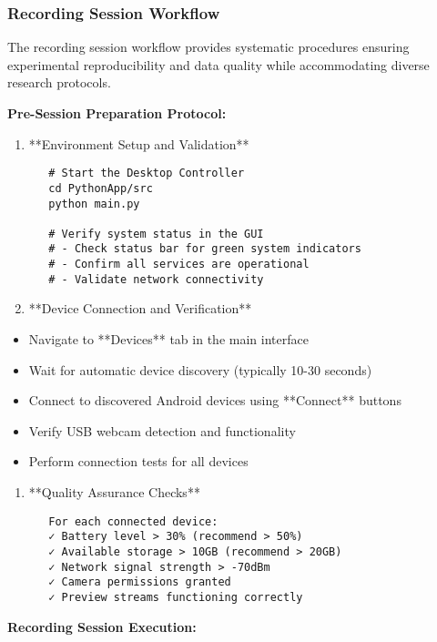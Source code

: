 \documentclass[12pt,a4paper]{article}
\begin{document}
\subsubsection{Recording Session Workflow}

The recording session workflow provides systematic procedures ensuring experimental reproducibility and data quality
while accommodating diverse research protocols.

\textbf{Pre-Session Preparation Protocol:}

\begin{enumerate}
\item **Environment Setup and Validation**
\begin{verbatim}
   # Start the Desktop Controller
   cd PythonApp/src
   python main.py
   
   # Verify system status in the GUI
   # - Check status bar for green system indicators
   # - Confirm all services are operational
   # - Validate network connectivity
\end{verbatim}

\item **Device Connection and Verification**
\end{enumerate}
\begin{itemize}
\item Navigate to **Devices** tab in the main interface
\item Wait for automatic device discovery (typically 10-30 seconds)
\item Connect to discovered Android devices using **Connect** buttons
\item Verify USB webcam detection and functionality
\item Perform connection tests for all devices

\end{itemize}
\begin{enumerate}
\item **Quality Assurance Checks**
\begin{verbatim}
   For each connected device:
   ✓ Battery level > 30% (recommend > 50%)
   ✓ Available storage > 10GB (recommend > 20GB)
   ✓ Network signal strength > -70dBm
   ✓ Camera permissions granted
   ✓ Preview streams functioning correctly
\end{verbatim}

\end{enumerate}
\textbf{Recording Session Execution:}
\end{document}

